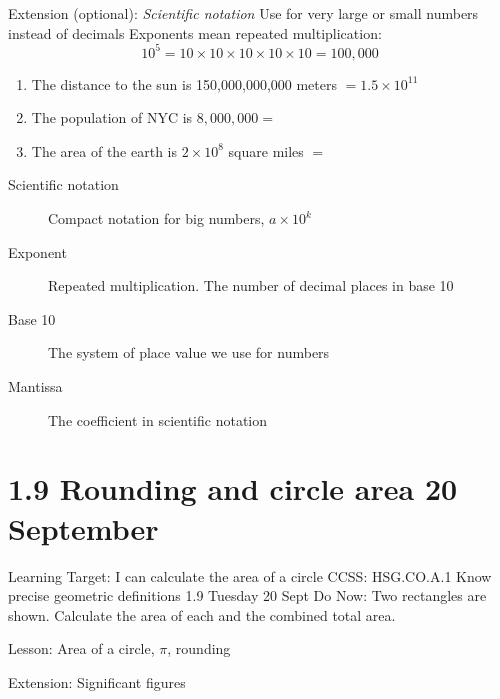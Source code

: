 \documentclass[onlytextwidth]{beamer}
\begin{document}
\begin{frame}{Extension (optional): \emph{Scientific notation}}
    {Use for very large or small numbers instead of decimals}
    Exponents mean repeated multiplication:
        $$10^5 = 10 \times 10 \times 10 \times 10 \times 10 = 100,000$$
    \begin{enumerate}
        \item The distance to the sun is 150,000,000,000 meters $=1.5 \times 10^{11}$
        \item The population of NYC is $8,000,000 = $ \bigskip
        \item The area of the earth is $2 \times 10^{8}$ square miles $=$
    \end{enumerate} \bigskip
    \begin{description}
        \item[Scientific notation] Compact notation for big numbers, $a \times 10^k$
        \item[Exponent] Repeated multiplication. The number of decimal places in base 10
        \item[Base 10] The system of place value we use for numbers
        \item[Mantissa] The coefficient in scientific notation
    \end{description}
    \end{frame}

\section{1.9 Rounding and circle area \hfill 20 September}
\begin{frame}{Learning Target: I can calculate the area of a circle}
    {CCSS: HSG.CO.A.1 Know precise geometric definitions \hfill \alert{1.9 Tuesday 20 Sept}}
        Do Now: Two rectangles are shown. Calculate the area of each and the combined total area.
        \begin{flushleft}
          \end{flushleft}
        Lesson: Area of a circle, $\pi$, rounding \par \medskip
        Extension: Significant figures
    \end{frame}
\end{document}

